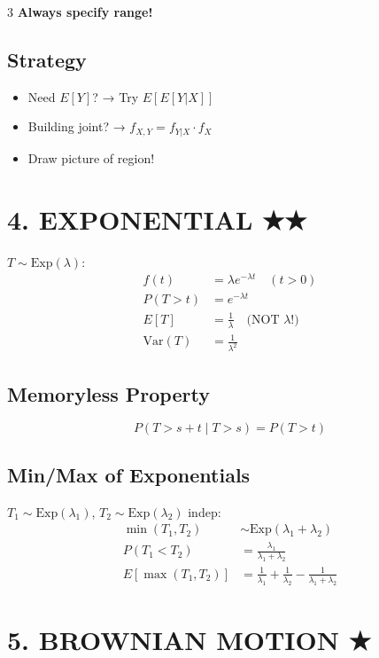 \documentclass[7pt,landscape]{extarticle}
\begin{document}
\begin{multicols}{3}
\textcolor{critical}{\textbf{Always specify range!}}

\subsection*{Strategy}
\begin{itemize}
\item Need $E[Y]$? → Try $E[E[Y|X]]$
\item Building joint? → $f_{X,Y} = f_{Y|X} \cdot f_X$
\item Draw picture of region!
\end{itemize}

\section*{4. EXPONENTIAL ★★}

$T \sim \text{Exp}(\lambda)$:
\begin{align*}
f(t) &= \lambda e^{-\lambda t} \quad (t > 0) \\
P(T > t) &= e^{-\lambda t} \\
E[T] &= \frac{1}{\lambda} \quad \text{(NOT } \lambda\text{!)} \\
\text{Var}(T) &= \frac{1}{\lambda^2}
\end{align*}

\subsection*{Memoryless Property}
\begin{compactbox}
$$P(T > s+t \mid T > s) = P(T > t)$$
\end{compactbox}

\subsection*{Min/Max of Exponentials}
$T_1 \sim \text{Exp}(\lambda_1)$, $T_2 \sim \text{Exp}(\lambda_2)$ indep:
\begin{align*}
\min(T_1, T_2) &\sim \text{Exp}(\lambda_1 + \lambda_2) \\
P(T_1 < T_2) &= \frac{\lambda_1}{\lambda_1 + \lambda_2} \\
E[\max(T_1, T_2)] &= \frac{1}{\lambda_1} + \frac{1}{\lambda_2} - \frac{1}{\lambda_1+\lambda_2}
\end{align*}

\columnbreak

\section*{5. BROWNIAN MOTION ★}


\end{multicols}
\end{document}
